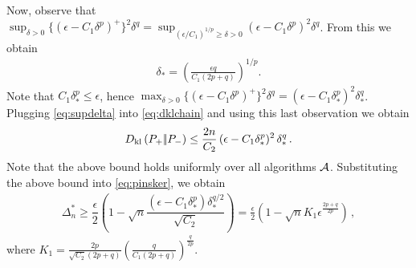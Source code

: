 Now, observe that 
$\sup_{\delta> 0} \{(\epsilon - C_1 \delta^p)^+\}^2 \delta^q = \sup_{(\epsilon/C_1)^{1/p} \ge \delta> 0} (\epsilon - C_1 \delta^p)^2 \delta^q$. From this we obtain
\begin{align}
\delta_*=\left(\frac{\epsilon q}{C_1(2p+q)}\right)^{1/p}. \label{eq:deltastar}
\end{align}
Note that $C_1\delta_*^p\le \epsilon$, hence
$\max_{\delta> 0} \{(\epsilon - C_1 \delta^p)^+\}^2 \delta^q =  (\epsilon-C_1 \delta_*^p)^2 \delta_*^q$.
Plugging \eqref{eq:supdelta} into \eqref{eq:dklchain} and using this last observation we obtain
\begin{align}
D_{\rm kl}\left({P_{+}} |\!| {P_{-}} \right) \le \dfrac{2n}{C_2} \,(\epsilon-C_1\delta_*^p)^2\, \delta_*^q\,.
\end{align}
Note that the above bound holds uniformly over all algorithms $\mathcal{A}$. 
Substituting the above bound into \eqref{eq:pinsker}, we obtain 
\begin{align}
\Delta_n^{*}
  \ge  \dfrac{\epsilon}{2} \left(1 - \sqrt{
    n}  \dfrac{ (\epsilon-C_1\delta_*^p)\delta_*^{q/2}}{\sqrt{C_2}}
  \right)
  = \frac{\epsilon}{2}\left(1-\sqrt{n} K_1 \epsilon^{\frac{2p+q}{2p}}\right)\,,\label{eq:final-lower-bd}
\end{align}
where $K_1= \frac{2p}{\sqrt{C_2}(2p+q)}\left(\frac{q}{C_1(2p+q)}\right)^{\frac{q}{2p}}$.
